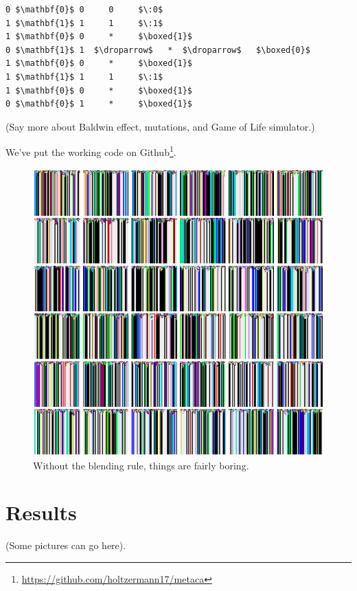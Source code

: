 \documentclass{AISB2008}
\makeatletter
\renewcommand{\boxed}[1]{\text{\fboxsep=.2em\fbox{\m@th$\displaystyle#1$}}}
\newcommand{\droparrow}{%
  \mathchoice{\raisebox{-4pt}{$\displaystyle\mapsto$}}
             {\raisebox{-4pt}{$\mapsto$}}
             {\raisebox{-2pt}{$\scriptstyle\mapsto$}}
             {\raisebox{-2pt}{$\scriptscriptstyle\mapsto$}}}
\makeatother
\begin{document}
\begin{lstlisting}[mathescape]
0 $\mathbf{0}$ 0     0     $\:0$
1 $\mathbf{1}$ 1     1     $\:1$
1 $\mathbf{0}$ 0     *     $\boxed{1}$
0 $\mathbf{1}$ 1  $\droparrow$   *  $\droparrow$   $\boxed{0}$
1 $\mathbf{0}$ 0     *     $\boxed{1}$
1 $\mathbf{1}$ 1     1     $\:1$
1 $\mathbf{0}$ 0     *     $\boxed{1}$
0 $\mathbf{0}$ 1     *     $\boxed{1}$
\end{lstlisting}

(Say more about Baldwin effect, mutations, and Game of Life
simulator.)

We've put the working code on Github\footnote{\url{https://github.com/holtzermann17/metaca}}. 


\newpage

\begin{figure}
\includegraphics[width=\columnwidth]{paint-drips.png}
\caption{Without the blending rule, things are fairly boring.}
\end{figure}
\clearpage

\section{Results}
(Some pictures can go here).
\end{document}
